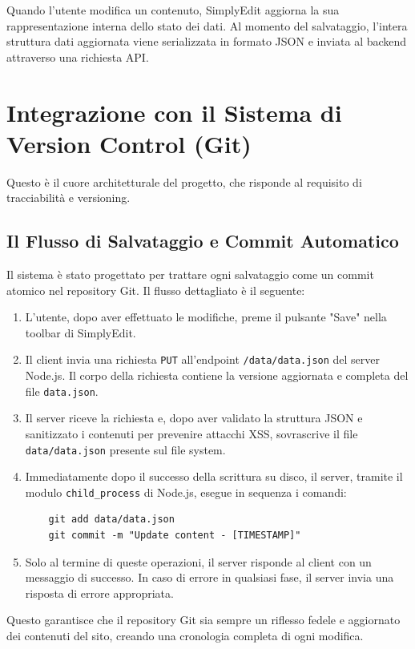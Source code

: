 Quando l'utente modifica un contenuto, SimplyEdit aggiorna la sua rappresentazione interna dello stato dei dati. Al momento del salvataggio, l'intera struttura dati aggiornata viene serializzata in formato JSON e inviata al backend attraverso una richiesta API.

\section{Integrazione con il Sistema di Version Control (Git)}
Questo è il cuore architetturale del progetto, che risponde al requisito di tracciabilità e versioning.

\subsection{Il Flusso di Salvataggio e Commit Automatico}
Il sistema è stato progettato per trattare ogni salvataggio come un commit atomico nel repository Git. Il flusso dettagliato è il seguente:
\begin{enumerate}
    \item L'utente, dopo aver effettuato le modifiche, preme il pulsante "Save" nella toolbar di SimplyEdit.
    \item Il client invia una richiesta \texttt{PUT} all'endpoint \texttt{/data/data.json} del server Node.js. Il corpo della richiesta contiene la versione aggiornata e completa del file \texttt{data.json}.
    \item Il server riceve la richiesta e, dopo aver validato la struttura JSON e sanitizzato i contenuti per prevenire attacchi XSS, sovrascrive il file \texttt{data/data.json} presente sul file system.
    \item Immediatamente dopo il successo della scrittura su disco, il server, tramite il modulo \texttt{child\_process} di Node.js, esegue in sequenza i comandi:
    \begin{verbatim}
    git add data/data.json
    git commit -m "Update content - [TIMESTAMP]"
    \end{verbatim}
    \item Solo al termine di queste operazioni, il server risponde al client con un messaggio di successo. In caso di errore in qualsiasi fase, il server invia una risposta di errore appropriata.
\end{enumerate}

Questo garantisce che il repository Git sia sempre un riflesso fedele e aggiornato dei contenuti del sito, creando una cronologia completa di ogni modifica.

